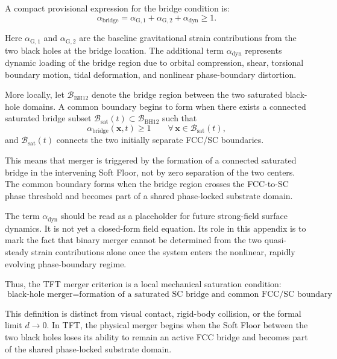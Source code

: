 A compact provisional expression for the bridge condition is:
\begin{equation}
    \alpha_{\mathrm{bridge}} = \alpha_{\mathrm{G},1} + \alpha_{\mathrm{G},2} + \alpha_{\mathrm{dyn}} \geq 1.
\end{equation}

Here $\alpha_{\mathrm{G},1}$ and $\alpha_{\mathrm{G},2}$ are the baseline gravitational strain contributions from the two black holes at the bridge location. The additional term $\alpha_{\mathrm{dyn}}$ represents dynamic loading of the bridge region due to orbital compression, shear, torsional boundary motion, tidal deformation, and nonlinear phase-boundary distortion.

More locally, let $\mathcal{B}_{\mathrm{BH12}}$ denote the bridge region between the two saturated black-hole domains. A common boundary begins to form when there exists a connected saturated bridge subset $\mathcal{B}_{\mathrm{sat}}(t) \subset \mathcal{B}_{\mathrm{BH12}}$ such that
\begin{equation}
    \alpha_{\mathrm{bridge}}(\mathbf{x},t) \geq 1 \qquad \forall\,\mathbf{x} \in \mathcal{B}_{\mathrm{sat}}(t),
\end{equation}
and $\mathcal{B}_{\mathrm{sat}}(t)$ connects the two initially separate FCC/SC boundaries.

This means that merger is triggered by the formation of a connected saturated bridge in the intervening Soft Floor, not by zero separation of the two centers. The common boundary forms when the bridge region crosses the FCC-to-SC phase threshold and becomes part of a shared phase-locked substrate domain.

The term $\alpha_{\mathrm{dyn}}$ should be read as a placeholder for future strong-field surface dynamics. It is not yet a closed-form field equation. Its role in this appendix is to mark the fact that binary merger cannot be determined from the two quasi-steady strain contributions alone once the system enters the nonlinear, rapidly evolving phase-boundary regime.

Thus, the TFT merger criterion is a local mechanical saturation condition:
\begin{equation}
    \boxed{ \text{black-hole merger} = \text{formation of a saturated SC bridge and common FCC/SC boundary} }.
\end{equation}

This definition is distinct from visual contact, rigid-body collision, or the formal limit $d \rightarrow 0$. In TFT, the physical merger begins when the Soft Floor between the two black holes loses its ability to remain an active FCC bridge and becomes part of the shared phase-locked substrate domain.

